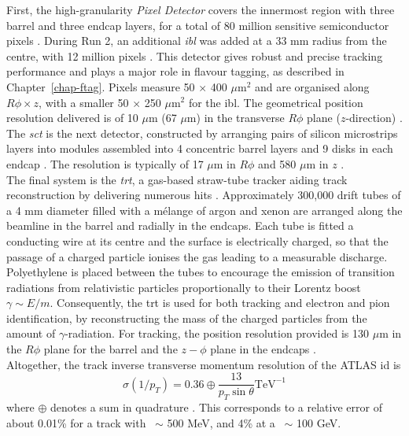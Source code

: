 First, the high-granularity \textit{Pixel Detector} covers the innermost region with three barrel and three endcap layers, for a total of 80 million sensitive semiconductor pixels \cite{CERN-LHCC-97-016, Potamianos:2015lar}. During Run 2, an additional \textit{\gls{ibl}} was added at a 33 mm radius from the centre, with 12 million pixels \cite{Capeans:1291633}. This detector gives robust and precise tracking performance and plays a major role in flavour tagging, as described in Chapter~\ref{chap-ftag}. Pixels measure 50 $\times$ 400 $\mu$m$^2$ and are organised along $R\phi \times z$, with a smaller 50 $\times$ 250 $\mu$m$^2$ for the \gls{ibl}. The geometrical position resolution delivered is of 10 $\mu$m (67 $\mu$m) in the transverse $R\phi$ plane ($z$-direction) \cite{Pernegger_2015, ATL-INDET-PUB-2016-001}. \\

The \textit{\gls{sct}} is the next detector, constructed by arranging pairs of silicon microstrips layers into modules assembled into 4 concentric barrel layers and 9 disks in each endcap \cite{AHMAD200798, CERN-LHCC-2017-005}. The resolution is typically of 17 $\mu$m in $R\phi$ and 580 $\mu$m in $z$ \cite{ATLASSCT}. \\

The final system is the \textit{\gls{trt}}, a gas-based straw-tube tracker aiding track reconstruction by delivering numerous hits \cite{TheATLASTRTcollaboration_2008}. Approximately 300,000 drift tubes of a 4 mm diameter filled with a mélange of argon and xenon are arranged along the beamline in the barrel and radially in the endcaps. Each tube is fitted a conducting wire at its centre and the surface is electrically charged, so that the passage of a charged particle ionises the gas leading to a measurable discharge. Polyethylene is placed between the tubes to encourage the emission of transition radiations from relativistic particles proportionally to their Lorentz boost $\gamma \sim E / m$. Consequently, the \gls{trt} is used for both tracking and electron and pion identification, by reconstructing the mass of the charged particles from the amount of $\gamma$-radiation. For tracking, the position resolution provided is 130 $\mu$m in the $R\phi$ plane for the barrel and the $z-\phi$ plane in the endcaps \cite{Vogel:1537991}. \\

Altogether, the track inverse transverse momentum resolution of the ATLAS \gls{id} is
\begin{equation}
  \sigma(1 / p_T) = 0.36 \oplus \frac{13}{p_T \sin\theta} \text{TeV}^{-1}
\end{equation}
where $\oplus$ denotes a sum in quadrature \cite{TheATLASCollaboration_2008}. This corresponds to a relative error of about 0.01\% for a track with \pt\ $\sim$ 500 MeV, and 4\% at a \pt\ $\sim$ 100 GeV.

